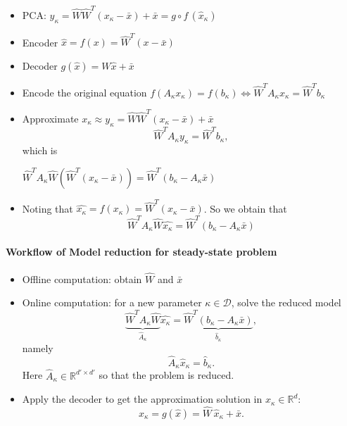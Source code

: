 \begin{itemize}\setlength{\itemsep}{10pt}

\item PCA: $y_\kappa=\hat{W}\hat{W}^T(x_\kappa-\bar{x})+\bar{x} = g \circ f \, (\hat x_{\kappa})$
\item Encoder $\hat{x}=f(x) = \hat{W}^T(x-\bar{x})$ 
\item Decoder $g(\hat{x})=W\hat{x}+\bar{x}$ 
\item Encode the original equation 
$
f(A_\kappa x_\kappa)=f(b_\kappa) \Leftrightarrow \hat W^T A_\kappa x_\kappa=\hat W^Tb_\kappa
$
\item Approximate $x_\kappa\approx y_\kappa=\hat{W}\hat{W}^T(x_\kappa-\bar{x})+\bar{x}$
	$$\hat W^T A_\kappa y_\kappa=\hat W^Tb_\kappa,$$
	which is
		
		\begin{center}
		$
		\hat W^T A_\kappa \hat{W} (\hat{W}^T(x_\kappa-\bar{x}))=\hat W^T(b_\kappa - A_{\kappa}\bar{x})
		$
		\end{center}
		
\item Noting that $\hat{x_\kappa} = f(x_\kappa) = \hat{W}^T(x_\kappa-\bar{x})$. So we obtain that
		$$
		\hat W^T A_\kappa \hat{W} \hat{x_\kappa} =\hat W^T(b_\kappa - A_{\kappa}\bar{x})
		$$
	\end{itemize}
	
	
\paragraph{Workflow  of Model reduction for steady-state problem}

\begin{itemize}
\item Offline computation: obtain $\hat W$ and $\bar{x}$

\item Online computation: for a new parameter $\kappa \in \mathcal{D}$, solve the reduced model
\begin{equation}
\underbrace{\hat{W}^T A_\kappa \hat{W}}_{{\hat{A}_{\kappa}}} \hat{x_\kappa} =\underbrace{\hat W^T(b_\kappa - A_{\kappa}\bar{x})}_{\hat{b}_\kappa},
\end{equation}
namely 
\begin{equation}
{\hat{A}_{\kappa}} \hat{x}_{\kappa} = \hat{b}_\kappa.
\end{equation} 
Here $\hat{A}_{\kappa} \in  \mathbb{R}^{d'\times d'}$ so that the problem is reduced. 
\item Apply the decoder to get the approximation solution in $x_{\kappa} \in \mathbb{R}^d$: 
$$
x_{\kappa}= g(\hat{x}) = \hat W \,  \hat{x}_{\kappa} + \bar{x}. 
$$
\end{itemize}

